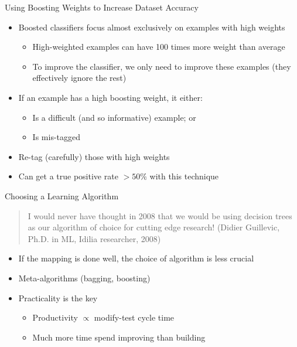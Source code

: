 \documentclass{beamer}
\begin{document}
\begin{frame}{Using Boosting Weights to Increase Dataset Accuracy}
  
  \begin{itemize}
  \item Boosted classifiers focus \alert{almost exclusively} on examples with \alert{high weights}
    \begin{itemize}
    \item High-weighted examples can have 100 times more weight than average
    \item To improve the classifier, we only need to improve these examples (they effectively ignore the rest)
    \end{itemize}
  \item If an example has a high boosting weight, it either:
    \begin{itemize}
    \item Is a difficult (and so informative) example; or
    \item Is mis-tagged
    \end{itemize}
  \item Re-tag (carefully) those with high weights
  \item Can get a true positive rate $> 50\%$ with this technique
  \end{itemize}
  
\end{frame}

\begin{frame}{Choosing a Learning Algorithm}
  \begin{quote}
    I would never have thought in 2008 that we would be using decision trees as our algorithm of choice for cutting edge research! (Didier Guillevic, Ph.D. in ML, Idilia researcher, 2008)
  \end{quote}
  
  \begin{itemize}
  \item If the mapping is done well, the choice of algorithm is less crucial
  \item Meta-algorithms (bagging, boosting) 
  \item Practicality is the key
    \begin{itemize}
    \item Productivity $\propto$ modify-test cycle time
    \item Much more time spend \alert{improving} than \alert{building}
    \end{itemize}
  \end{itemize}
  
\end{frame}
\end{document}
